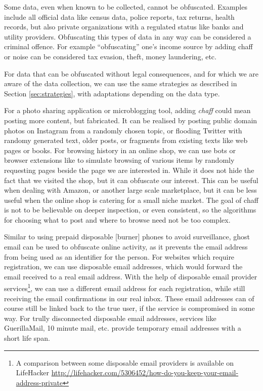 \documentclass{IOS-Book-Article}     %
\newcommand{\tbox}[3][red]{{
\color{#1}\noindent{
   \fbox{\scriptsize{ {\bf #2} \textsl{#3}}}
   \vspace{2pt}
}
}}
\newcommand{\todo}[1]{\tbox{TODO:}{#1}}
\begin{document}
Some data, even when known to be collected, cannot be obfuscated. Examples 
include all official data like census data, police reports, tax returns, health 
records, but also private organizations with a regulated status like banks and 
utility providers. Obfuscating this types of data in any way can be considered 
a criminal offence. 
For example ``obfuscating'' one's income source by adding chaff or noise can be 
considered tax evasion, theft, money laundering, etc.

For data that can be obfuscated without legal consequences, and for 
which we are aware of the data collection, we can use the same 
strategies as described in Section \ref{sec:strategies}, with adaptations 
depending on the data type. 

For a photo sharing application or microblogging tool, adding \emph{chaff} 
could mean posting more content, but fabricated. 
It can be realised by posting public domain photos on Instagram from a randomly 
chosen topic, or flooding Twitter with randomy generated text, older posts, or 
fragments from existing texts like web pages or books. For browsing history in 
an online shop, we can use bots or browser extensions like 
\todo{example} to simulate browsing of various items by randomly requesting 
pages beside the page we are interested in. While it does 
not hide the fact that we visited the shop, but it can obfuscate our interest. 
This can be useful when dealing with Amazon, or another large scale marketplace, 
but it can be less useful when the online shop is catering for a small niche 
market. 
The goal of chaff is not to be believable on deeper inspection, or even 
consistent, so the algorithms for choosing what to post and where to browse 
need not be too complex. 

Similar to using prepaid disposable [burner] phones to avoid surveillance, 
ghost email can be used to obfuscate online activity, as it prevents the email 
address from being used as an identifier for the person. For websites which 
require registration, we can use disposable email addresses, which would 
forward the email received to a real email address. With 
the help of disposable email provider services\footnote{A comparison between 
some disposable email providers is available on LifeHacker 
\url{http://lifehacker.com/5306452/how-do-you-keep-your-email-address-private}}, 
we can use a different email address for each registration, while still 
receiving the email confirmations in our real inbox. These email addresses can 
of course still be linked back to the true user, if the service is compromised 
in some way. For trully disconnected disposable email addresses, services like 
GuerillaMail, 10 minute mail, etc. provide temporary email addresses with a 
short life span. 
\end{document}

